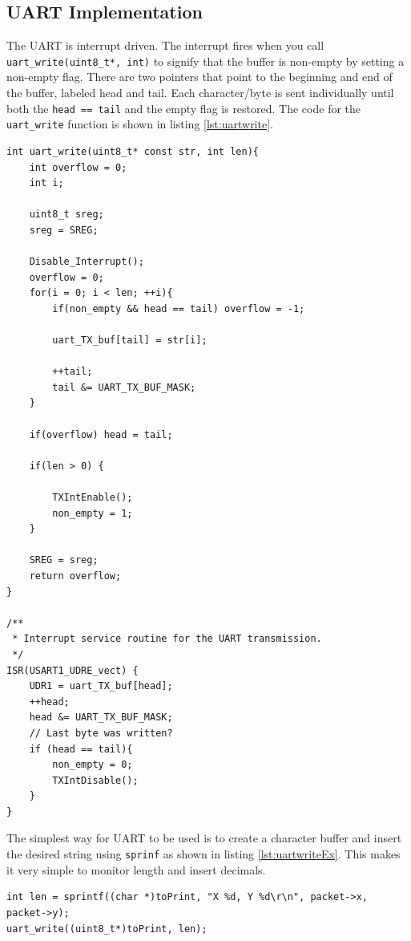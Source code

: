 \subsection{UART Implementation}
The UART is interrupt driven. The interrupt fires when you call
\texttt{uart\_write(uint8\_t*, int)} to signify that the buffer is non-empty by
setting a non-empty flag. There are two pointers that point to the beginning and
end of the buffer, labeled head and tail. Each character/byte is sent individually until
both the \texttt{head == tail} and the empty flag is restored. The code for the
\texttt{uart\_write} function is shown in listing \ref{lst:uartwrite}.

\begin{lstlisting}[label={lst:uartwrite},
                   caption={UART write function and ISR}]
int uart_write(uint8_t* const str, int len){
    int overflow = 0;
    int i;

    uint8_t sreg;
    sreg = SREG;

    Disable_Interrupt();
    overflow = 0;
    for(i = 0; i < len; ++i){  
        if(non_empty && head == tail) overflow = -1;

        uart_TX_buf[tail] = str[i];

        ++tail;
        tail &= UART_TX_BUF_MASK;
    }
    
    if(overflow) head = tail;     

    if(len > 0) {

        TXIntEnable();
        non_empty = 1;
    }

    SREG = sreg;
    return overflow; 
}

/**
 * Interrupt service routine for the UART transmission.
 */
ISR(USART1_UDRE_vect) {
    UDR1 = uart_TX_buf[head];
    ++head;
    head &= UART_TX_BUF_MASK;
    // Last byte was written?
    if (head == tail){
        non_empty = 0;
        TXIntDisable();
    }
}
\end{lstlisting}

The simplest way for UART to be used is to create a character buffer and insert
the desired string using \texttt{sprinf} as shown in listing
\ref{lst:uartwriteEx}. This makes it very simple to monitor length and insert
decimals. 

\begin{lstlisting}[float=ht,
                   caption={An example usage of \texttt{uart\_write} function},
                   label={lst:uartwriteEx}]
int len = sprintf((char *)toPrint, "X %d, Y %d\r\n", packet->x, packet->y);
uart_write((uint8_t*)toPrint, len);
\end{lstlisting}

